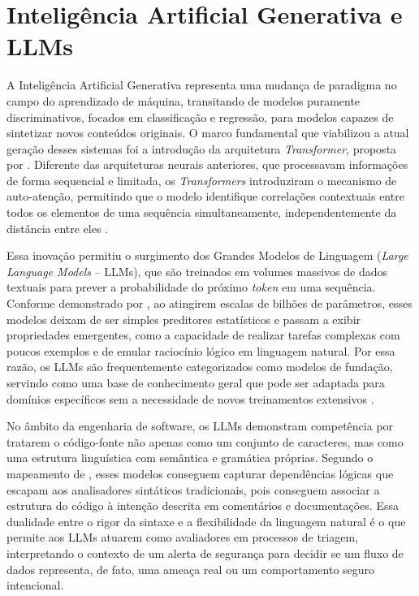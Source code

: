 \section{Inteligência Artificial Generativa e LLMs}
A Inteligência Artificial Generativa representa uma mudança de paradigma no campo do aprendizado de máquina, transitando de modelos puramente discriminativos, focados em classificação e regressão, para modelos capazes de sintetizar novos conteúdos originais. O marco fundamental que viabilizou a atual geração desses sistemas foi a introdução da arquitetura \textit{Transformer}, proposta por . Diferente das arquiteturas neurais anteriores, que processavam informações de forma sequencial e limitada, os \textit{Transformers} introduziram o mecanismo de auto-atenção, permitindo que o modelo identifique correlações contextuais entre todos os elementos de uma sequência simultaneamente, independentemente da distância entre eles \cite{vaswani2017attention}.

Essa inovação permitiu o surgimento dos Grandes Modelos de Linguagem (\textit{Large Language Models} – LLMs), que são treinados em volumes massivos de dados textuais para prever a probabilidade do próximo \textit{token} em uma sequência. Conforme demonstrado por , ao atingirem escalas de bilhões de parâmetros, esses modelos deixam de ser simples preditores estatísticos e passam a exibir propriedades emergentes, como a capacidade de realizar tarefas complexas com poucos exemplos e de emular raciocínio lógico em linguagem natural. Por essa razão, os LLMs são frequentemente categorizados como modelos de fundação, servindo como uma base de conhecimento geral que pode ser adaptada para domínios específicos sem a necessidade de novos treinamentos extensivos \cite{hou2024large}.

No âmbito da engenharia de software, os LLMs demonstram competência por tratarem o código-fonte não apenas como um conjunto de caracteres, mas como uma estrutura linguística com semântica e gramática próprias. Segundo o mapeamento de , esses modelos conseguem capturar dependências lógicas que escapam aos analisadores sintáticos tradicionais, pois conseguem associar a estrutura do código à intenção descrita em comentários e documentações. Essa dualidade entre o rigor da sintaxe e a flexibilidade da linguagem natural é o que permite aos LLMs atuarem como avaliadores em processos de triagem, interpretando o contexto de um alerta de segurança para decidir se um fluxo de dados representa, de fato, uma ameaça real ou um comportamento seguro intencional.

